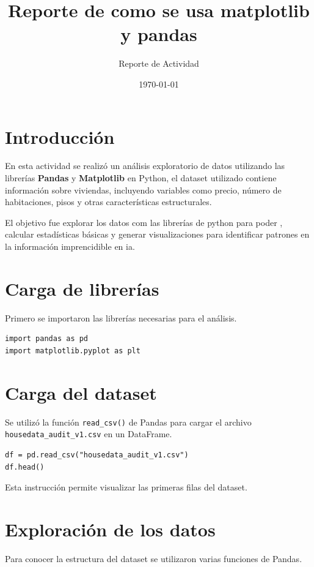 \documentclass{article}
\title{Reporte de como se usa matplotlib y pandas}
\author{Reporte de Actividad}
\date{\today}
\begin{document}
\maketitle

\section{Introducción}

En esta actividad se realizó un análisis exploratorio de datos utilizando las librerías
\textbf{Pandas} y \textbf{Matplotlib} en Python, el dataset utilizado contiene información
sobre viviendas, incluyendo variables como precio, número de habitaciones,
pisos y otras características estructurales.

El objetivo fue explorar los datos com las librerías de python para poder , calcular estadísticas básicas y generar
visualizaciones para identificar patrones en la información imprencidible en ia.

\section{Carga de librerías}

Primero se importaron las librerías necesarias para el análisis.

\begin{lstlisting}
import pandas as pd
import matplotlib.pyplot as plt
\end{lstlisting}

\section{Carga del dataset}

Se utilizó la función \texttt{read\_csv()} de Pandas para cargar el archivo
\texttt{housedata\_audit\_v1.csv} en un DataFrame.

\begin{lstlisting}
df = pd.read_csv("housedata_audit_v1.csv")
df.head()
\end{lstlisting}

Esta instrucción permite visualizar las primeras filas del dataset.

\section{Exploración de los datos}

Para conocer la estructura del dataset se utilizaron varias funciones de Pandas.
\end{document}
